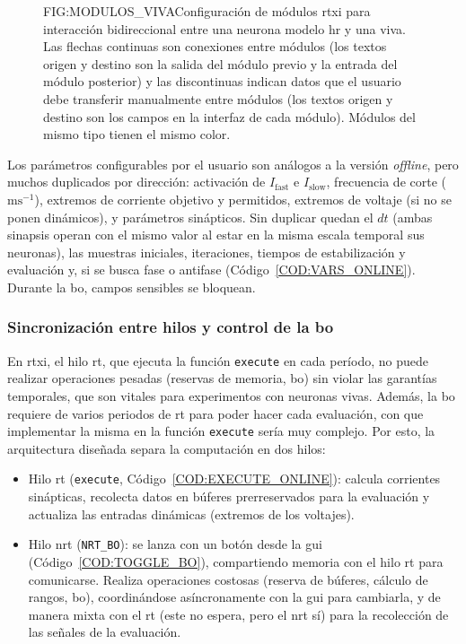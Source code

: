 \begin{figure}[Esquema de módulos \acs{rtxi} para circuito bidireccional biohíbrido]{FIG:MODULOS_VIVA}{Configuración de módulos \ac{rtxi} para interacción bidireccional entre una neurona modelo \ac{hr} y una viva. Las flechas continuas son conexiones entre módulos (los textos origen y destino son la salida del módulo previo y la entrada del módulo posterior) y las discontinuas indican datos que el usuario debe transferir manualmente entre módulos (los textos origen y destino son los campos en la interfaz de cada módulo). Módulos del mismo tipo tienen el mismo color.}
\end{figure}

Los parámetros configurables por el usuario son análogos a la versión \textit{offline}, pero muchos duplicados por dirección: activación de \(I_{\mathrm{fast}}\) e \(I_{\mathrm{slow}}\), frecuencia de corte (\(\mathrm{ms}^{-1}\)), extremos de corriente objetivo y permitidos, extremos de voltaje (si no se ponen dinámicos), y parámetros sinápticos. Sin duplicar quedan el \(dt\) (ambas sinapsis operan con el mismo valor al estar en la misma escala temporal sus neuronas), las muestras iniciales, iteraciones, tiempos de estabilización y evaluación y, si se busca fase o antifase (Código~\ref{COD:VARS_ONLINE}). Durante la \ac{bo}, campos sensibles se bloquean.

\subsubsection{Sincronización entre hilos y control de la \acl{bo}\label{SUBSUBSEC:SINCRONIZACION}}

En \ac{rtxi}, el hilo \ac{rt}, que ejecuta la función \texttt{execute} en cada período, no puede realizar operaciones pesadas (reservas de memoria, \ac{bo}) sin violar las garantías temporales, que son vitales para experimentos con neuronas vivas. Además, la \ac{bo} requiere de varios periodos de \ac{rt} para poder hacer cada evaluación, con que implementar la misma en la función \texttt{execute} sería muy complejo. Por esto, la arquitectura diseñada separa la computación en dos hilos:

\begin{itemize}
    \item Hilo \ac{rt} (\texttt{execute}, Código~\ref{COD:EXECUTE_ONLINE}): calcula corrientes sinápticas, recolecta datos en búferes prerreservados para la evaluación y actualiza las entradas dinámicas (extremos de los voltajes).
    \item Hilo \ac{nrt} (\texttt{NRT\_BO}): se lanza con un botón desde la \ac{gui} (Código~\ref{COD:TOGGLE_BO}), compartiendo memoria con el hilo \ac{rt} para comunicarse. Realiza operaciones costosas (reserva de búferes, cálculo de rangos, \ac{bo}), coordinándose asíncronamente con la \ac{gui} para cambiarla, y de manera mixta con el \ac{rt} (este no espera, pero el \ac{nrt} sí) para la recolección de las señales de la evaluación.
\end{itemize}

